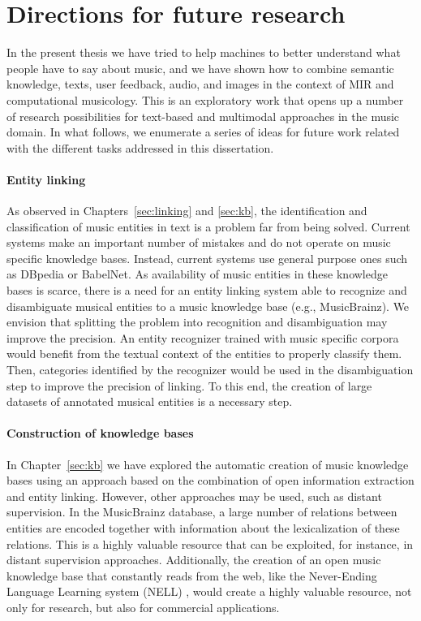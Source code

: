 \section{Directions for future research}
\label{sec:conclusion:future}

In the present thesis we have tried to help machines to better understand what people have to say about music, and we have shown how to combine semantic knowledge, texts, user feedback, audio, and images in the context of MIR and computational musicology. This is an exploratory work that opens up a number of research possibilities for text-based and multimodal approaches in the music domain. In what follows, we enumerate a series of ideas for future work related with the different tasks addressed in this dissertation.

\paragraph{Entity linking} As observed in Chapters~\ref{sec:linking} and \ref{sec:kb}, the identification and classification of music entities in text is a problem far from being solved. Current systems make an important number of mistakes and do not operate on music specific knowledge bases. Instead, current systems use general purpose ones such as DBpedia or BabelNet. As availability of music entities in these knowledge bases is scarce, there is a need for an entity linking system able to recognize and disambiguate musical entities to a music knowledge base (e.g., MusicBrainz). We envision that splitting the problem into recognition and disambiguation may improve the precision. An entity recognizer trained with music specific corpora would benefit from the textual context of the entities to properly classify them. Then, categories identified by the recognizer would be used in the disambiguation step to improve the precision of linking. To this end, the creation of large datasets of annotated musical entities is a necessary step. %

\paragraph{Construction of knowledge bases} In Chapter~\ref{sec:kb} we have explored the automatic creation of music knowledge bases using an approach based on the combination of open information extraction and entity linking. However, other approaches may be used, such as distant supervision. In the MusicBrainz database,  a large number of relations between entities are encoded together with information about the lexicalization of these relations. This is a highly valuable resource that can be exploited, for instance, in distant supervision approaches. Additionally, the creation of an open music knowledge base that constantly reads from the web, like the Never-Ending Language Learning system (NELL) \citep{Carlson2010a}, would create a highly valuable resource, not only for research, but also for commercial applications.

